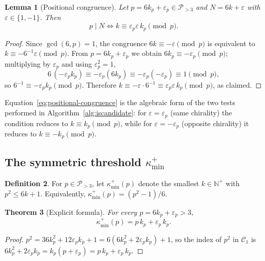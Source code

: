 \documentclass[11pt]{amsart}
\numberwithin{equation}{section}
\newcommand{\NN}{\mathbb{N}}
\newcommand{\cP}{\mathcal{P}}
\newcommand{\kminp}{\kappa_{\min}^{+}}
\newcommand{\Cone}{\mathcal{C}_1}
\theoremstyle{plain}
\newtheorem{theorem}{Theorem}[section]
\newtheorem{lemma}[theorem]{Lemma}
\theoremstyle{definition}
\newtheorem{definition}[theorem]{Definition}
\begin{document}
\begin{lemma}[Positional congruence]
\label{lem:congruence}
Let $p=6k_p+\varepsilon_p\in\cP_{>3}$ and $N=6k+\varepsilon$ with
$\varepsilon\in\{1,-1\}$. Then
\begin{equation}
p\mid N\iff k\equiv\varepsilon_p\varepsilon\,k_p\pmod p.
\label{eq:positional-congruence}
\end{equation}
\end{lemma}

\begin{proof}
Since $\gcd(6,p)=1$, the congruence $6k\equiv-\varepsilon\pmod p$ is
equivalent to $k\equiv-6^{-1}\varepsilon\pmod p$. From
$p=6k_p+\varepsilon_p$ we obtain $6k_p\equiv-\varepsilon_p\pmod p$;
multiplying by $\varepsilon_p$ and using $\varepsilon_p^2=1$,
\begin{equation*}
6\,(-\varepsilon_p k_p)\equiv-\varepsilon_p(6k_p)
\equiv-\varepsilon_p(-\varepsilon_p)\equiv 1\pmod p,
\end{equation*}
so $6^{-1}\equiv-\varepsilon_p k_p\pmod p$. Therefore
$k\equiv-\varepsilon\cdot 6^{-1}\equiv\varepsilon_p\varepsilon\,k_p
\pmod p$, as claimed.
\end{proof}

Equation~\eqref{eq:positional-congruence} is the algebraic form of the
two tests performed in Algorithm~\ref{alg:iscandidate}: for
$\varepsilon=\varepsilon_p$ (same chirality) the condition reduces to
$k\equiv k_p\pmod p$, while for $\varepsilon=-\varepsilon_p$ (opposite
chirality) it reduces to $k\equiv-k_p\pmod p$.

\subsection{The symmetric threshold \texorpdfstring{$\kminp$}{k\_min+}}
\label{subsec:kminp}

\begin{definition}
\label{def:kminp}
For $p\in\cP_{>3}$, let $\kminp(p)$ denote the smallest $k\in\NN^+$
with $p^2\le 6k+1$. Equivalently, $\kminp(p)=(p^2-1)/6$.
\end{definition}

\begin{theorem}[Explicit formula]
\label{thm:kminp}
For every $p=6k_p+\varepsilon_p>3$,
\begin{equation}
\kminp(p)=p\,k_p+\varepsilon_p\,k_p.
\label{eq:kminp}
\end{equation}
\end{theorem}

\begin{proof}
$p^2=36k_p^2+12\varepsilon_p k_p+1=6(6k_p^2+2\varepsilon_p k_p)+1$, so
the index of $p^2$ in $\Cone$ is
$6k_p^2+2\varepsilon_p k_p=k_p(p+\varepsilon_p)=p\,k_p+\varepsilon_p\,k_p$.
\end{proof}
\end{document}
